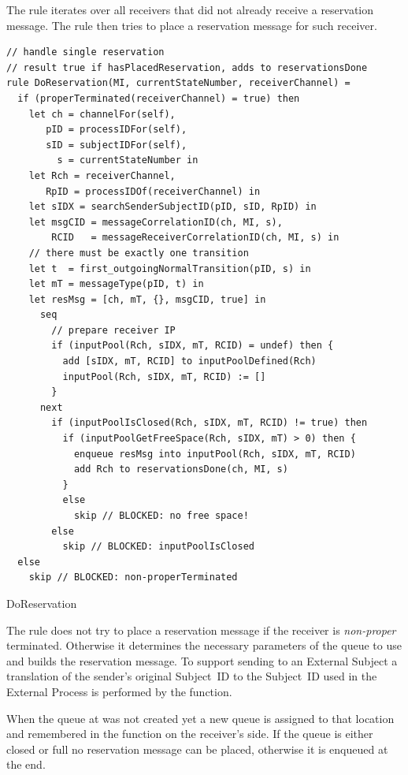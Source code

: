 The  rule iterates over all receivers that did not
already receive a reservation message. The  rule
then tries to place a reservation message for such receiver.

\begin{listing}[htbp]
\begin{verbatim}
// handle single reservation
// result true if hasPlacedReservation, adds to reservationsDone
rule DoReservation(MI, currentStateNumber, receiverChannel) =
  if (properTerminated(receiverChannel) = true) then
    let ch = channelFor(self),
       pID = processIDFor(self),
       sID = subjectIDFor(self),
         s = currentStateNumber in
    let Rch = receiverChannel,
       RpID = processIDOf(receiverChannel) in
    let sIDX = searchSenderSubjectID(pID, sID, RpID) in
    let msgCID = messageCorrelationID(ch, MI, s),
        RCID   = messageReceiverCorrelationID(ch, MI, s) in
    // there must be exactly one transition
    let t  = first_outgoingNormalTransition(pID, s) in
    let mT = messageType(pID, t) in
    let resMsg = [ch, mT, {}, msgCID, true] in
      seq
        // prepare receiver IP
        if (inputPool(Rch, sIDX, mT, RCID) = undef) then {
          add [sIDX, mT, RCID] to inputPoolDefined(Rch)
          inputPool(Rch, sIDX, mT, RCID) := []
        }
      next
        if (inputPoolIsClosed(Rch, sIDX, mT, RCID) != true) then
          if (inputPoolGetFreeSpace(Rch, sIDX, mT) > 0) then {
            enqueue resMsg into inputPool(Rch, sIDX, mT, RCID)
            add Rch to reservationsDone(ch, MI, s)
          }
          else
            skip // BLOCKED: no free space!
        else
          skip // BLOCKED: inputPoolIsClosed
  else
    skip // BLOCKED: non-properTerminated
\end{verbatim}
\caption{DoReservation}
\label{lst:shortasm:DoReservation}
\end{listing}


The  rule does not try to place a reservation message
if the receiver is \textit{non-proper} terminated. Otherwise it determines
the necessary parameters of the queue to use and builds the reservation message.
To support sending to an External Subject a translation of the sender's original
Subject~ID to the Subject~ID used in the External Process is performed by the
 function.

When the queue at  was not
created yet a new queue is assigned to that location and remembered in the
 function on the receiver's side.
If the queue is either closed or full no reservation message can be placed,
otherwise it is enqueued at the end.



